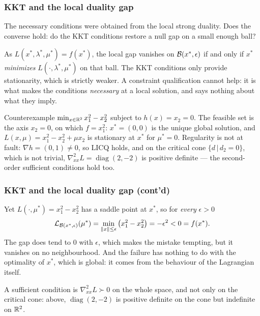 \documentclass[usepdftitle=false,aspectratio=169]{beamer}
\def\red{\color{red}}
\begin{document}
\begin{frame}
\frametitle{KKT and the local duality gap}
\small

The necessary conditions were obtained from the {\red local} strong duality. Does the converse hold: do the KKT conditions restore a null gap on a small enough ball?

\mbox{}

As $L(x^*, \lambda^*, \mu^*) = f(x^*)$, the local gap vanishes on ${\mathcal{B}}(x^*, \epsilon)$ {\red if and only if} $x^*$ \emph{minimizes} $L(\cdot, \lambda^*, \mu^*)$ on that ball. The KKT conditions only provide {\red stationarity}, which is strictly weaker.
A constraint qualification cannot help: it is what makes the conditions {\it necessary} at a local solution, and says nothing about what they imply.

\begin{block}{Counterexample}
$\min_{x \in {\mathbb{R}}^2} x_1^2 - x_2^2$ subject to $h(x) = x_2 = 0$.
The feasible set is the axis $x_2 = 0$, on which $f = x_1^2$: $x^* = (0,0)$ is the unique global solution, and $L(x,\mu) = x_1^2 - x_2^2 + \mu x_2$ is stationary at $x^*$ for $\mu^* = 0$.
Regularity is not at fault: $\nabla h = (0,1) \neq 0$, so {\red LICQ holds}, and on the critical cone $\lbrace d \,|\, d_2 = 0 \rbrace$, which is not trivial, $\nabla^2_{xx}L = \operatorname{diag}(2,-2)$ is positive definite --- the {\red second-order sufficient conditions hold} too.
\end{block}

\end{frame}

\begin{frame}
\frametitle{KKT and the local duality gap (cont'd)}

Yet $L(\cdot, \mu^*) = x_1^2 - x_2^2$ has a {\red saddle point} at $x^*$, so for {\it every} $\epsilon > 0$
$$
{\mathcal{L}}_{{\mathcal{B}}(x^*, \epsilon)}(\mu^*) = \min_{\|x\| \leq \epsilon} \left( x_1^2-x_2^2 \right) = -\epsilon^2 < 0 = f(x^*).
$$
The gap does tend to $0$ with $\epsilon$, which makes the mistake tempting, but it vanishes on no neighbourhood.
And the failure has nothing to do with the optimality of $x^*$, which is global: it comes from the behaviour of the Lagrangian itself.

\mbox{}

A sufficient condition is $\nabla^2_{xx} L \succ 0$ on the {\red whole} space, and not only on the critical cone: above, $\operatorname{diag}(2,-2)$ is positive definite on the cone but indefinite on ${\mathbb{R}}^2$.

\end{frame}
\end{document}
